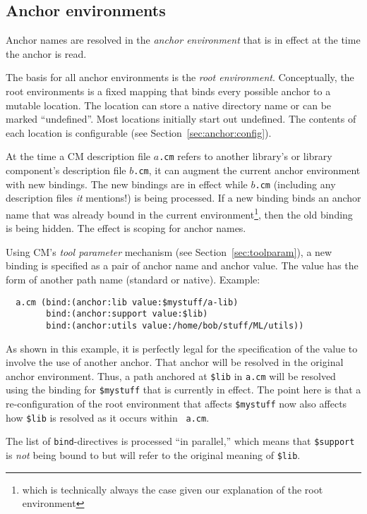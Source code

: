 \documentclass[titlepage,letterpaper]{article}
\begin{document}
\subsection{Anchor environments}
\label{sec:anchor:env}

Anchor names are resolved in the {\em anchor environment} that is in
effect at the time the anchor is read.

The basis for all anchor environments is the {\em root environment}.
Conceptually, the root environments is a fixed mapping that binds
every possible anchor to a mutable location.  The location can store a
native directory name or can be marked ``undefined''.  Most locations
initially start out undefined.  The contents of each location is
configurable (see Section~\ref{sec:anchor:config}).

At the time a CM description file $a${\tt .cm} refers to another
library's or library component's description file $b${\tt .cm}, it can
augment the current anchor environment with new bindings.  The new
bindings are in effect while $b${\tt .cm} (including any description
files {\it it}\/ mentions!) is being processed.  If a new binding
binds an anchor name that was already bound in the current
environment\footnote{which is technically always the case given our
explanation of the root environment}, then the old binding is being
hidden.  The effect is scoping for anchor names.

Using CM's {\em tool parameter} mechanism (see
Section~\ref{sec:toolparam}), a new binding is specified as a pair of
anchor name and anchor value.  The value has the form of another path
name (standard or native). Example:

\begin{verbatim}
  a.cm (bind:(anchor:lib value:$mystuff/a-lib)
        bind:(anchor:support value:$lib)
        bind:(anchor:utils value:/home/bob/stuff/ML/utils))
\end{verbatim}

As shown in this example, it is perfectly legal for the specification
of the value to involve the use of another anchor.  That anchor will
be resolved in the original anchor environment. Thus, a path anchored
at {\tt \$lib} in {\tt a.cm} will be resolved using the binding for
{\tt \$mystuff} that is currently in effect.  The point here is that a
re-configuration of the root environment that affects {\tt \$mystuff}
now also affects how {\tt \$lib} is resolved as it occurs within {\tt
a.cm}.

The list of {\tt bind}-directives is processed ``in parallel,'' which
means that {\tt \$support} is {\em not} being bound to but will refer to the original meaning of
{\tt \$lib}.
\end{document}
